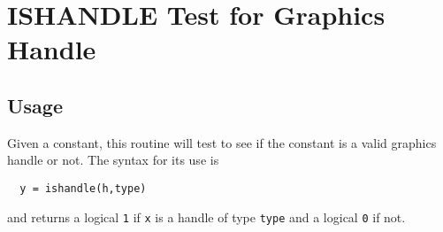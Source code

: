 \section{ISHANDLE Test for Graphics Handle}

\subsection{Usage}

Given a constant, this routine will test to see if the
constant is a valid graphics handle or not.  The syntax
for its use is
\begin{verbatim}
  y = ishandle(h,type)
\end{verbatim}
and returns a logical \verb|1| if \verb|x| is a handle of type \verb|type|
and a logical \verb|0| if not.  

